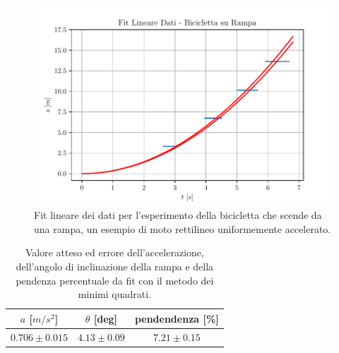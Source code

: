 \documentclass{report} \usepackage[T1]{fontenc} \usepackage[italian]{babel}
\begin{document}
\begin{figure}[H]
  \centering
  \includegraphics[width=\textwidth]{fit_bike}
  \caption{Fit lineare dei dati per l'esperimento della bicicletta che scende da una rampa,
           un esempio di moto rettilineo uniformemente accelerato.}
  \label{fig:fit_bike}
\end{figure}

\begin{table}[H]
  \renewcommand{\arraystretch}{1.5}
  \centering
  \begin{tabular}{ | c | c | c | }
    \hline
    $a$ [$m/s^2$] &  $\theta$ [deg] & pendendenza [\%] \\
    \hline
    $0.706\pm0.015$ & $4.13\pm0.09$ & $7.21\pm0.15$ \\
    \hline
  \end{tabular}
  \caption{Valore atteso ed errore dell'accelerazione, dell'angolo di inclinazione della rampa
           e della pendenza percentuale da fit con il metodo dei minimi quadrati.}
  \label{tab:fit_bike}
\end{table}

{}

\end{document}
